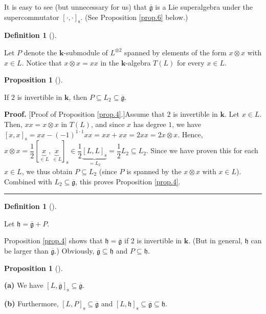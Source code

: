 \documentclass[numbers=enddot,12pt,final,onecolumn,notitlepage]{scrartcl}%
\theoremstyle{definition}
\newtheorem{prop}[theo]{Proposition}
\newenvironment{proposition}[1][]
{\begin{prop}[#1]\begin{leftbar}}
{\end{leftbar}\end{prop}}
\newtheorem{defi}[theo]{Definition}
\newenvironment{definition}[1][]
{\begin{defi}[#1]\begin{leftbar}}
{\end{leftbar}\end{defi}}
\newenvironment{proof}[1][Proof]{\noindent\textbf{#1.} }{\ \rule{0.5em}{0.5em}}
\begin{document}
It is easy to see (but unnecessary for us) that $\overline{\mathfrak{g}}$ is a
Lie superalgebra under the supercommutator $\left[  \cdot,\cdot\right]
_{\operatorname*{s}}$. (See Proposition \ref{prop.6} below.)

\begin{definition}
\label{def.P}Let $P$ denote the $\mathbf{k}$-submodule of $L^{\otimes2}$
spanned by elements of the form $x\otimes x$ with $x\in L$. Notice that
$x\otimes x=xx$ in the $\mathbf{k}$-algebra $T\left(  L\right)  $ for every
$x\in L$.
\end{definition}

\begin{proposition}
\label{prop.4}If $2$ is invertible in $\mathbf{k}$, then $P\subseteq
L_{2}\subseteq\overline{\mathfrak{g}}$.
\end{proposition}

\begin{proof}
[Proof of Proposition \ref{prop.4}.]Assume that $2$ is invertible in
$\mathbf{k}$. Let $x\in L$. Then, $xx=x\otimes x$ in $T\left(  L\right)  $,
and since $x$ has degree $1$, we have $\left[  x,x\right]  _{\operatorname*{s}%
}=xx-\left(  -1\right)  ^{1\cdot1}xx=xx+xx=2xx=2x\otimes x$. Hence, $x\otimes
x=\dfrac{1}{2}\left[  \underbrace{x}_{\in L},\underbrace{x}_{\in L}\right]
_{\operatorname*{s}}\in\dfrac{1}{2}\underbrace{\left[  L,L\right]
_{\operatorname*{s}}}_{=L_{2}}=\dfrac{1}{2}L_{2}\subseteq L_{2}$. Since we
have proven this for each $x\in L$, we thus obtain $P\subseteq L_{2}$ (since
$P$ is spanned by the $x\otimes x$ with $x\in L$). Combined with
$L_{2}\subseteq\overline{\mathfrak{g}}$, this proves Proposition \ref{prop.4}.
\end{proof}

\begin{definition}
Let $\mathfrak{h}=\overline{\mathfrak{g}}+P$.
\end{definition}

Proposition \ref{prop.4} shows that $\mathfrak{h}=\overline{\mathfrak{g}}$ if
$2$ is invertible in $\mathbf{k}$. (But in general, $\mathfrak{h}$ can be
larger than $\overline{\mathfrak{g}}$.) Obviously, $\overline{\mathfrak{g}%
}\subseteq\mathfrak{h}$ and $P\subseteq\mathfrak{h}$.

\begin{proposition}
\label{prop.5}\textbf{(a)} We have $\left[  L,\overline{\mathfrak{g}}\right]
_{\operatorname*{s}}\subseteq\overline{\mathfrak{g}}$. \medskip

\textbf{(b)} Furthermore, $\left[  L,P\right]  _{\operatorname*{s}}%
\subseteq\overline{\mathfrak{g}}$ and $\left[  L,\mathfrak{h}\right]
_{\operatorname*{s}}\subseteq\overline{\mathfrak{g}}\subseteq\mathfrak{h}$.
\end{proposition}
\end{document}
